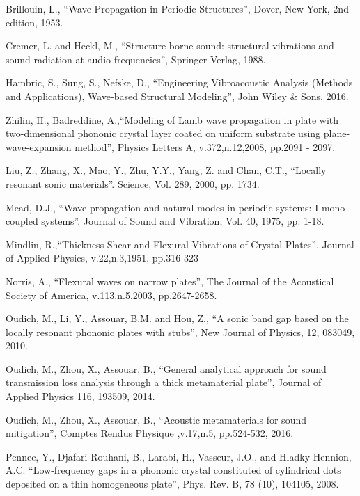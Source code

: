 \documentclass[a4paper]{ICEDyn}
\begin{document}
   
	\begin{thebibliography}{99}
		
		 Brillouin, L., ``Wave Propagation in Periodic Structures'', Dover, New York, 2nd edition, 1953.
		
		 Cremer, L. and Heckl, M., ``Structure-borne sound: structural vibrations and sound radiation at audio frequencies'', Springer-Verlag, 1988.
		
		 Hambric, S., Sung, S., Nefske, D., ``Engineering Vibroacoustic Analysis (Methods and Applications), Wave-based Structural Modeling'', John Wiley \& Sons, 2016.
		
		 Zhilin, H., Badreddine, A.,``Modeling of Lamb wave propagation in plate with two-dimensional phononic crystal layer coated on uniform substrate using plane-wave-expansion method'', Physics Letters A, v.372,n.12,2008, pp.2091 - 2097.
		
		 Liu, Z., Zhang, X., Mao, Y., Zhu, Y.Y., Yang, Z. and Chan, C.T., ``Locally resonant sonic materials''. Science, Vol. 289, 2000, pp. 1734.
		
		 Mead, D.J., ``Wave propagation and natural modes in periodic systems: I mono-coupled systems”. Journal of Sound and Vibration, Vol. 40, 1975, pp. 1-18.
		
		 Mindlin, R.,``Thickness Shear and Flexural Vibrations of Crystal Plates'',
		Journal of Applied Physics, v.22,n.3,1951, pp.316-323
		
		 Norris, A., ``Flexural waves on narrow plates'', The Journal of the Acoustical Society of America, v.113,n.5,2003, pp.2647-2658.
		
		 Oudich, M., Li, Y.,  Assouar, B.M. and Hou, Z., ``A sonic band gap based on the locally resonant phononic plates with stubs'', New Journal of Physics, 12, 083049, 2010.
		
		 Oudich, M., Zhou, X., Assouar, B.,	``General analytical approach for sound transmission loss analysis through a thick metamaterial plate'',	Journal of Applied Physics 116, 193509, 2014.
		
		 Oudich, M., Zhou, X., Assouar, B., ``Acoustic metamaterials for sound mitigation'', Comptes Rendus Physique ,v.17,n.5, pp.524-532, 2016. 
		
		 Pennec, Y., Djafari-Rouhani, B., Larabi, H., Vasseur, J.O.,  and Hladky-Hennion, A.C.  ``Low-frequency gaps in a phononic crystal constituted of cylindrical dots deposited on a thin homogeneous plate'', Phys. Rev. B, 78 (10), 104105, 2008.
		

\end{thebibliography}
\end{document}
